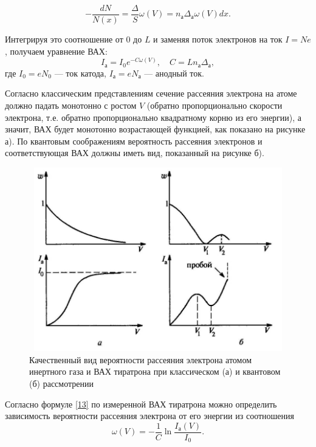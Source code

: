 \documentclass[12pt]{article}
\begin{document}
\begin{equation}
	- \frac{dN}{N(x)} = \frac{\Delta}{S} \omega(V) = n_\text{а} \Delta_\text{а} \omega(V) dx.
\end{equation}
\par
	Интегрируя это соотношение от $0$ до $L$ и заменяя поток электронов на ток $I = N e$, получаем уравнение ВАХ:
\begin{equation}
	I_\text{а} = I_\text{0} e^{-C \omega(V)}, \quad C = L n_\text{а} \Delta_\text{а}, \label{13}
\end{equation}
где $I_\text{0} = e N_\text{0}$ --- ток катода, $I_\text{а} = e N_\text{а}$ --- анодный ток.
\par
	Согласно классическим представлениям сечение рассеяния электрона на атоме должно падать монотонно с ростом $V$ (обратно пропорционально скорости электрона, т.е. обратно пропорционально квадратному корню из его энергии), а значит, ВАХ будет монотонно возрастающей функцией, как показано на рисунке а). По квантовым соображениям вероятность рассеяния электронов и соответствующая ВАХ должны иметь вид, показанный на рисунке б).
\newpage
\begin{figure}[h!]
	\centering
	\includegraphics[width = 12cm, height = 8cm]{image2.png}
	\caption{Качественный вид вероятности рассеяния электрона атомом инертного газа и ВАХ тиратрона при классическом (а) и квантовом (б) рассмотрении}
\end{figure}
\par
	Согласно формуле \ref{13} по измеренной ВАХ тиратрона можно определить зависимость вероятности рассеяния электрона от его энергии из соотношения
\begin{equation}
	\omega(V) = - \frac{1}{C} \ln\frac{I_\text{а}(V)}{I_0}.
\end{equation}
\par
\end{document}
